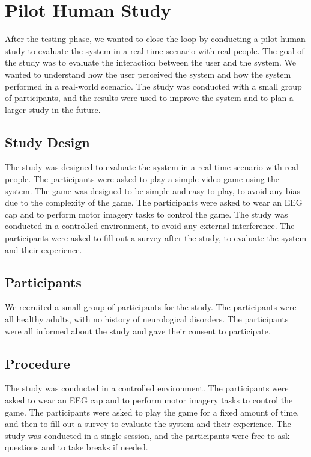 \chapter{Pilot Human Study}\label{ch:human_study}
After the testing phase, we wanted to close the loop by conducting a pilot human study to evaluate the system in a real-time scenario with real people.
The goal of the study was to evaluate the interaction between the user and the system. 
We wanted to understand how the user perceived the system and how the system performed in a real-world scenario. 
The study was conducted with a small group of participants, and the results were used to improve the system and to plan a larger study in the future.

\section{Study Design}
The study was designed to evaluate the system in a real-time scenario with real people.
The participants were asked to play a simple video game using the system.
The game was designed to be simple and easy to play, to avoid any bias due to the complexity of the game.
The participants were asked to wear an EEG cap and to perform motor imagery tasks to control the game.
The study was conducted in a controlled environment, to avoid any external interference.
The participants were asked to fill out a survey after the study, to evaluate the system and their experience.

\section{Participants}
We recruited a small group of participants for the study.
The participants were all healthy adults, with no history of neurological disorders.
The participants were all informed about the study and gave their consent to participate.

\section{Procedure}
The study was conducted in a controlled environment.
The participants were asked to wear an EEG cap and to perform motor imagery tasks to control the game.
The participants were asked to play the game for a fixed amount of time, and then to fill out a survey to evaluate the system and their experience.
The study was conducted in a single session, and the participants were free to ask questions and to take breaks if needed.

